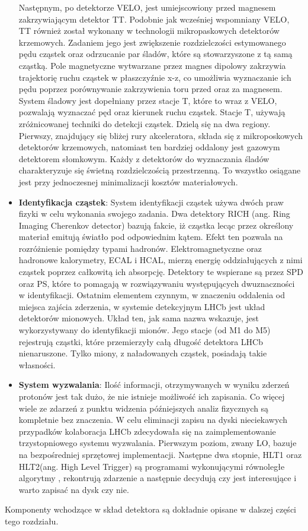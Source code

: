 \begin{itemize}
Następnym, po detektorze VELO, jest umiejscowiony przed magnesem zakrzywiającym detektor TT. Podobnie jak wcześniej wspomniany VELO, TT również został wykonany w technologii mikropaskowych detektorów krzemowych. Zadaniem jego jest zwiększenie rozdzielczości estymowanego pędu cząstek oraz odrzucanie par śladów, które są stowarzyszone z tą samą cząstką. Pole magnetyczne wytwarzane przez magnes dipolowy zakrzywia trajektorię ruchu cząstek w płaszczyźnie x-z, co umożliwia wyznaczanie ich pędu poprzez porównywanie zakrzywienia toru przed oraz za magnesem. System śladowy jest dopełniany przez stacje T, które to wraz z VELO, pozwalają wyznaczać pęd oraz kierunek ruchu cząstek. Stacje T, używają zróżnicowanej techniki do detekcji cząstek. Dzielą się na dwa regiony. Pierwszy, znajdujący się bliżej rury akceleratora, składa się z mikroposkowych detektorów krzemowych, natomiast ten bardziej oddalony jest  gazowym detektorem słomkowym.
Każdy z detektorów do wyznaczania śladów charakteryzuje się świetną rozdzielczością przestrzenną. To wszystko osiągane jest przy jednoczesnej minimalizacji kosztów materiałowych. 
\item \textbf{Identyfikacja cząstek}: System identyfikacji cząstek używa dwóch praw  fizyki w celu wykonania swojego zadania. Dwa detektory RICH  (ang. Ring Imaging Cherenkov detector) bazują fakcie, iż cząstka lecąc przez określony materiał emitują światło pod odpowiednim kątem. Efekt ten pozwala na rozróżnienie pomiędzy typami hadronów. Elektromagnetyczne oraz hadronowe kalorymetry, ECAL i HCAL, mierzą energię oddziałujących z nimi cząstek poprzez całkowitą ich absorpcję. Detektory te wspierane są przez SPD oraz PS, które to pomagają w rozwiązywaniu występujących dwuznaczności w identyfikacji. Ostatnim elementem czynnym, w znaczeniu oddalenia od miejsca  zajścia zderzenia, w systemie detekcyjnym LHCb jest układ detektorów mionowych. Układ ten, jak sama nazwa wskazuje, jest wykorzystywany do identyfikacji mionów. Jego stacje (od M1 do M5) rejestrują cząstki, które przemierzyły całą długość detektora LHCb nienaruszone. Tylko miony, z naładowanych cząstek, posiadają takie własności. 
\item \textbf{System wyzwalania}: Ilość informacji, otrzymywanych w wyniku zderzeń protonów jest tak dużo, że nie istnieje możliwość ich zapisania. Co więcej wiele ze zdarzeń z punktu widzenia późniejszych analiz fizycznych są kompletnie bez znaczenia. W celu eliminacji zapisu na dyski nieciekawych przypadków kolaboracja LHCb zdecydowała się na zaimplementowanie trzystopniowego systemu wyzwalania. Pierwszym poziom, zwany LO, bazuje na bezpośredniej sprzętowej implementacji. Następne dwa stopnie, HLT1 oraz HLT2(ang. High Level Trigger) są programami wykonującymi równoległe algorytmy  , rekontrują zdarzenie a następnie decydują czy jest interesujące i warto zapisać na dysk czy nie.      
\end{itemize} 
Komponenty wchodzące w skład detektora są dokładnie opisane w dalszej części tego rozdziału. 

